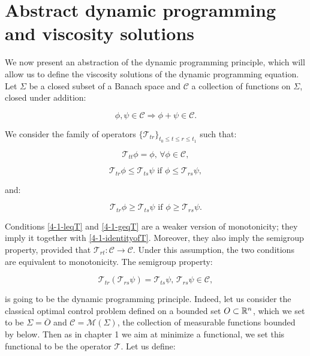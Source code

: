 \section{Abstract dynamic programming and viscosity solutions}

We now present an abstraction of the dynamic programming principle, which will allow us to define the viscosity solutions of the dynamic programming 
equation. Let $\Sigma$ be a closed subset of a Banach space and $\mathcal{C}$ a collection of functions on $\Sigma$, closed under addition:

\[\phi,\psi\in\mathcal{C}\Rightarrow \phi+\psi\in\mathcal{C}.\]

We consider the family of operators $\{\mathcal{T}_{tr}\}_{t_0\leq t\leq r\leq t_1}$ such that: 

\begin{equation}\label{4-1-identityofT}
    \mathcal{T}_{tt}\phi = \phi,\, \forall\phi\in\mathcal{C},
\end{equation}

\begin{equation}\label{4-1-leqT}
    \mathcal{T}_{tr}\phi\leq\mathcal{T}_{ts}\psi \text{ if } \phi\leq \mathcal{T}_{rs}\psi,
\end{equation}

and:

\begin{equation}\label{4-1-geqT}
    \mathcal{T}_{tr}\phi\geq\mathcal{T}_{ts}\psi \text{ if } \phi\geq \mathcal{T}_{rs}\psi.
\end{equation}

Conditions \ref{4-1-leqT} and \ref{4-1-geqT} are a weaker version of monotonicity; they imply it together with \ref{4-1-identityofT}. 
Moreover, they also imply the semigroup property, provided that $\mathcal{T}_{rt}:\mathcal{C}\rightarrow\mathcal{C}$. Under this assumption,
the two conditions are equivalent to monotonicity. The semigroup property:

\begin{equation}
    \mathcal{T}_{tr}\left(\mathcal{T}_{rs}\psi\right)=\mathcal{T}_{ts}\psi,\,\mathcal{T}_{rs}\psi\in\mathcal{C},
\end{equation}

is going to be the dynamic programming principle. Indeed, let us consider the classical optimal control problem defined on a bounded set 
$O\subset\mathbb{R}^n$, which we set to be $\Sigma=\overline{O}$ and $\mathcal{C}=\mathcal{M}(\Sigma)$, the collection of measurable functions bounded by below. Then as in chapter 1 we aim at minimize a functional, 
we set this functional to be the operator $\mathcal{T}$. Let us define:

